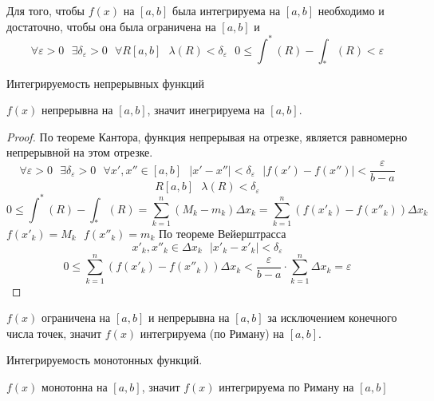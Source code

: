 \begin{theorem}
  Для того, чтобы $f(x)$ на $[a,b]$ была интегрируема на $[a,b]$ необходимо
  и достаточно, чтобы она была ограничена на $[a,b]$ и
  \[
    \forall \varepsilon > 0 ~~~ \exists \delta_\varepsilon > 0 ~~~ \forall R
    [a,b] ~~~ \lambda (R) < \delta_\varepsilon ~~~ 0 \le \int^* (R) -
    \int_* (R) < \varepsilon
  \]
\end{theorem}

\begin{title}[\Large]
  Интегрируемость непрерывных функций
\end{title}

\begin{theorem}
  $f(x)$ непрерывна на $[a,b]$, значит инегрируема на $[a,b]$.
\end{theorem}

\begin{proof}
  По теореме Кантора, функция непрерывая на отрезке, является равномерно
  непрерывной на этом отрезке.
  \[
    \forall \varepsilon > 0 ~~~ \exists \delta_\varepsilon > 0 ~~~ \forall
    x', x'' \in [a,b] ~~~ |x' - x''| < \delta_\varepsilon ~~~
    |f(x') - f(x'')| < \frac{\varepsilon}{b - a}
  \]
  \[R [a,b] ~~~ \lambda (R) < \delta_\varepsilon\]
  \[
    0 \le \int^* (R) - \int_* (R) = \sum_{k = 1}^{n} (M_k - m_k)
    \Delta x_k = \sum_{k = 1}^{n} (f(x'_k) - f(x''_k)) \Delta x_k
  \]
  $f(x'_k) = M_k ~~~ f(x''_k) = m_k$
  По теореме Вейерштрасса
  \[x'_k, x''_k \in \Delta x_k ~~~ |x'_k - x'_k| < \delta_\varepsilon\]
  \[
    0 \le \sum_{k = 1}^{n} (f(x'_k) - f(x''_k)) \Delta x_k <
    \frac{\varepsilon}{b - a} \cdot \sum_{k = 1}^{n} \Delta x_k = \varepsilon
  \]
\end{proof}

\begin{theorem}
  $f(x)$ ограничена на $[a,b]$ и непрерывна на $[a,b]$ за исключением конечного
  числа точек, значит $f(x)$ интегрируема (по Риману) на $[a,b]$.
\end{theorem}

\begin{title}[\Large]
  Интегрируемость монотонных функций.
\end{title}

\begin{theorem}
  $f(x)$ монотонна на $[a,b]$, значит $f(x)$ интегрируема по Риману на $[a,b]$
\end{theorem}

